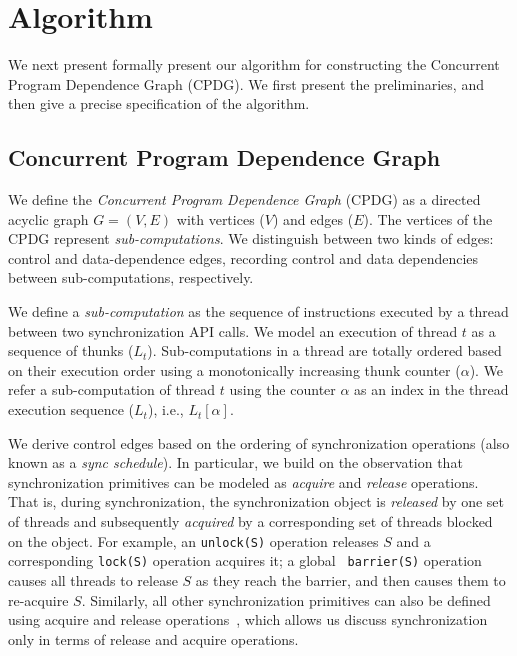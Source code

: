 \section{Algorithm}
\label{sec:algorithms}

We next present formally present our algorithm for constructing the Concurrent Program Dependence Graph (CPDG). We first present the preliminaries,
and then give a precise specification of the algorithm.



\subsection{Concurrent Program Dependence Graph}  We define the {\em
Concurrent Program Dependence Graph} (CPDG)  as a directed acyclic graph $G =
(V,E)$ with vertices ($V$) and edges ($E$). The
vertices of the CPDG represent {\em sub-computations}. We distinguish between two kinds of edges: control and data-dependence edges, recording control and data dependencies between sub-computations, respectively.


 We define a {\em sub-computation}  as the sequence of instructions
executed by a thread between two \pthreads synchronization API calls. We model an execution of thread $t$ as a sequence of thunks
($L_t$). Sub-computations in a thread are totally ordered based on their execution order
using a monotonically increasing thunk counter ($\alpha$). We refer a sub-computation of thread $t$ using the counter $\alpha$ as an index in the thread execution sequence ($L_t$), i.e., $L_t[\alpha]$.

 We derive control edges based on the ordering of synchronization operations (also known as a {\em sync schedule}). In particular,  we build on the observation that synchronization primitives can be modeled as {\em acquire} and {\em release} operations. That is,   during synchronization, the synchronization object is {\em released} by one set of threads and subsequently  {\em acquired} by a corresponding set of threads blocked on the object. For example, an {\tt unlock(S)} operation releases $S$
and a corresponding {\tt lock(S)} operation acquires it; a global {\tt
barrier(S)} operation causes all threads to release $S$ as they reach the
barrier, and then causes them to re-acquire $S$. Similarly, all other
synchronization primitives can also be defined using acquire and release
operations~\cite{djit, fast-track-pldi}, which allows us discuss synchronization only in terms of release and acquire operations.



